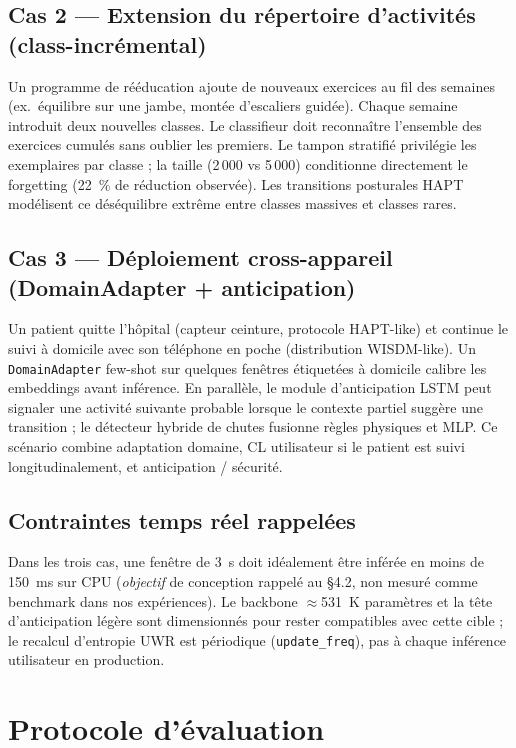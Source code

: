 \documentclass[a4paper,12pt]{report}
\begin{document}
\subsection{Cas 2 — Extension du répertoire d'activités (class-incrémental)}

Un programme de rééducation ajoute de nouveaux exercices au fil des semaines
(ex.\ équilibre sur une jambe, montée d'escaliers guidée). Chaque semaine introduit
deux nouvelles classes. Le classifieur doit reconnaître l'ensemble des exercices
cumulés sans oublier les premiers. Le tampon stratifié privilégie les exemplaires
par classe ; la taille (2\,000 vs 5\,000) conditionne directement le forgetting
(22~\% de réduction observée). Les transitions posturales HAPT modélisent ce
déséquilibre extrême entre classes massives et classes rares.

\subsection{Cas 3 — Déploiement cross-appareil (DomainAdapter + anticipation)}

Un patient quitte l'hôpital (capteur ceinture, protocole HAPT-like) et continue
le suivi à domicile avec son téléphone en poche (distribution WISDM-like). Un
\texttt{DomainAdapter} few-shot sur quelques fenêtres étiquetées à domicile
calibre les embeddings avant inférence. En parallèle, le module d'anticipation LSTM peut signaler
une activité suivante probable lorsque le contexte partiel suggère une
transition ; le détecteur hybride de chutes fusionne règles physiques et MLP.
Ce scénario combine adaptation domaine, CL utilisateur si le patient est suivi
longitudinalement, et anticipation / sécurité.

\subsection{Contraintes temps réel rappelées}

Dans les trois cas, une fenêtre de 3~s doit idéalement être inférée en moins de
150~ms sur CPU (\emph{objectif} de conception rappelé au §4.2, non mesuré comme
benchmark dans nos expériences). Le backbone $\approx$531~K paramètres et la
tête d'anticipation légère sont dimensionnés pour rester compatibles avec cette
cible ; le recalcul d'entropie UWR est périodique (\texttt{update\_freq}), pas à chaque inférence utilisateur en production.

\section{Protocole d'évaluation}
\end{document}

